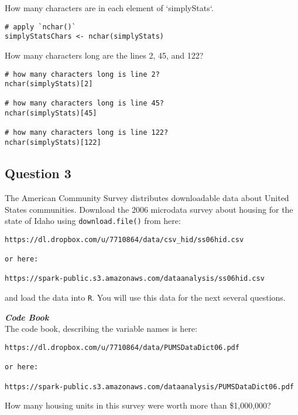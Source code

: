 \documentclass[]{article}
\begin{document}
How many characters are in each element of `simplyStats`. 
\begin{framed}
\begin{verbatim}
# apply `nchar()`
simplyStatsChars <- nchar(simplyStats)
\end{verbatim}
\end{framed}

How many characters long are the lines 2, 45, and 122?
\begin{framed}
\begin{verbatim}
# how many characters long is line 2?
nchar(simplyStats)[2]

# how many characters long is line 45?
nchar(simplyStats)[45]

# how many characters long is line 122?
nchar(simplyStats)[122]
\end{verbatim}
\end{framed}

\newpage
\subsection*{Question 3}

The American Community Survey distributes downloadable data about United States communities. 
Download the 2006 microdata survey about housing for the state of Idaho using \texttt{download.file()} from here: 

\begin{verbatim}
https://dl.dropbox.com/u/7710864/data/csv_hid/ss06hid.csv

or here:

https://spark-public.s3.amazonaws.com/dataanalysis/ss06hid.csv 
\end{verbatim}
and load the data into \texttt{R}. You will use this data for the next several questions. 

\noindent \textbf{\textit{Code Book}}\\
The code book, describing the variable names is here: 

\begin{verbatim}
https://dl.dropbox.com/u/7710864/data/PUMSDataDict06.pdf

or here: 

https://spark-public.s3.amazonaws.com/dataanalysis/PUMSDataDict06.pdf
\end{verbatim}
\bigskip
How many housing units in this survey were worth more than \$1,000,000?
\end{document}

